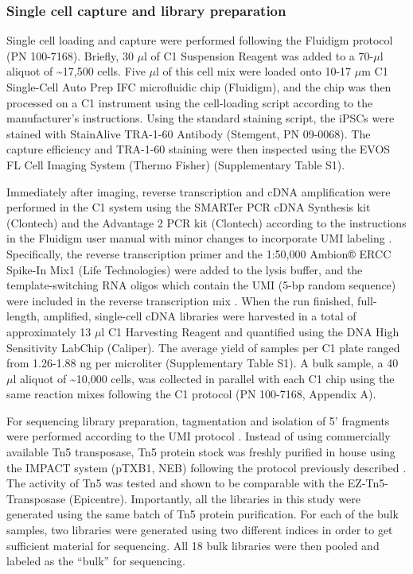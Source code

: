 \subsubsection{Single cell capture and library
preparation}\label{single-cell-capture-and-library-preparation}

Single cell loading and capture were performed following the Fluidigm
protocol (PN 100-7168). Briefly, 30 $\mu$l of C1 Suspension Reagent was
added to a 70-$\mu$l aliquot of \textasciitilde{}17,500 cells. Five
$\mu$l of this cell mix were loaded onto 10-17 $\mu$m C1 Single-Cell
Auto Prep IFC microfluidic chip (Fluidigm), and the chip was then
processed on a C1 instrument using the cell-loading script according to
the manufacturer's instructions. Using the standard staining script, the
iPSCs were stained with StainAlive TRA-1-60 Antibody (Stemgent, PN
09-0068). The capture efficiency and TRA-1-60 staining were then
inspected using the EVOS FL Cell Imaging System (Thermo Fisher)
(Supplementary Table S1).

Immediately after imaging, reverse transcription and cDNA amplification
were performed in the C1 system using the SMARTer PCR cDNA Synthesis kit
(Clontech) and the Advantage 2 PCR kit (Clontech) according to the
instructions in the Fluidigm user manual with minor changes to
incorporate UMI labeling \citep{Islam2014}. Specifically, the reverse
transcription primer and the 1:50,000 Ambion® ERCC Spike-In Mix1 (Life
Technologies) were added to the lysis buffer, and the template-switching
RNA oligos which contain the UMI (5-bp random sequence) were included in
the reverse transcription mix \citep{Islam2011, Islam2012, Islam2014}.
When the run finished, full-length, amplified, single-cell cDNA
libraries were harvested in a total of approximately 13 $\mu$l C1
Harvesting Reagent and quantified using the DNA High Sensitivity LabChip
(Caliper). The average yield of samples per C1 plate ranged from
1.26-1.88 ng per microliter (Supplementary Table S1). A bulk sample, a
40 $\mu$l aliquot of \textasciitilde{}10,000 cells, was collected in
parallel with each C1 chip using the same reaction mixes following the
C1 protocol (PN 100-7168, Appendix A).

For sequencing library preparation, tagmentation and isolation of 5'
fragments were performed according to the UMI protocol \citep{Islam2014}.
Instead of using commercially available Tn5 transposase, Tn5 protein
stock was freshly purified in house using the IMPACT system (pTXB1, NEB)
following the protocol previously described \citep{Picelli2014}. The
activity of Tn5 was tested and shown to be comparable with the
EZ-Tn5-Transposase (Epicentre). Importantly, all the libraries in this
study were generated using the same batch of Tn5 protein purification.
For each of the bulk samples, two libraries were generated using two
different indices in order to get sufficient material for sequencing.
All 18 bulk libraries were then pooled and labeled as the ``bulk'' for
sequencing.

